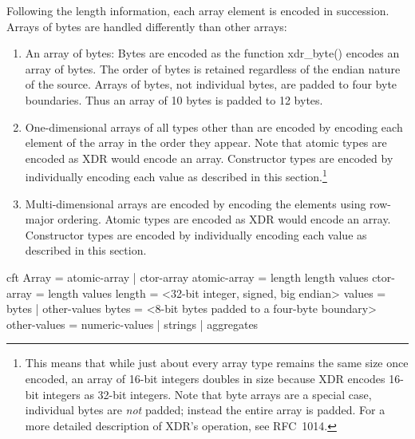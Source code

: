 \documentclass[justify]{nasa-ese}
\begin{document}
  Following the length information, each array element is encoded in
  succession. Arrays of bytes are handled differently than other arrays:
\begin{enumerate}
\item An array of bytes: Bytes are encoded as the function xdr\_byte()
  encodes an array of bytes. The order of bytes is retained regardless
  of the endian nature of the source. Arrays of bytes, not individual
  bytes, are padded to four byte boundaries. Thus an array of 10 bytes
  is padded to 12 bytes.
  
\item One-dimensional arrays of all types other than  are
  encoded by encoding each element of the array in the order they
  appear. Note that atomic types are encoded as XDR would encode an
  array. Constructor types are encoded by individually encoding each
  value as described in this section.\footnote{This means that while
    just about every array type remains the same size once encoded,
    an array of 16-bit integers doubles in size because XDR encodes
    16-bit integers as 32-bit integers. Note that byte arrays are a
    special case, individual bytes are {\it not} padded; instead the
    entire array is padded. For a more detailed description of XDR's
    operation, see RFC~1014\cite{xdr}.}

\item Multi-dimensional arrays are encoded by encoding the elements
  using row-major ordering. Atomic types are encoded as XDR would
  encode an array. Constructor types are encoded by individually
  encoding each value as described in this section.

\end{enumerate}

\begin{vcode}{cft}
Array        = atomic-array | ctor-array
atomic-array = length length values 
ctor-array   = length values 
length       = <32-bit integer, signed, big endian> 
values       = bytes | other-values 
bytes        = <8-bit bytes padded to a four-byte boundary> 
other-values = numeric-values | strings | aggregates 
\end{vcode}

\end{document}
